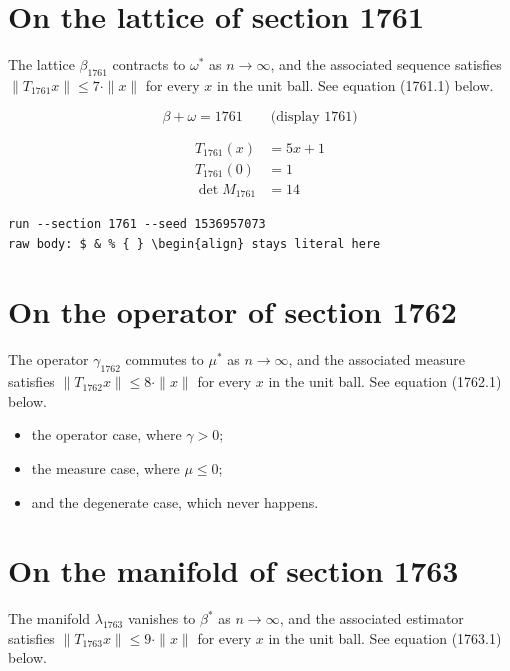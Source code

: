 \documentclass{article}
\begin{document}
\section{On the lattice of section 1761}
The lattice $\beta_{1761}$ contracts to $\omega^{*}$ as $n \to \infty$,
and the associated sequence satisfies $\|T_{1761} x\| \leq 7 \cdot \|x\|$
for every $x$ in the unit ball. See equation (1761.1) below.

$$
\beta + \omega = 1761 \qquad \text{(display 1761)}
$$

\begin{align}
T_{1761}(x) &= 5 x + 1 \\
T_{1761}(0) &= 1 \\
\det M_{1761} &= 14
\end{align}

\begin{verbatim}
run --section 1761 --seed 1536957073
raw body: $ & % { } \begin{align} stays literal here
\end{verbatim}

\section{On the operator of section 1762}
The operator $\gamma_{1762}$ commutes to $\mu^{*}$ as $n \to \infty$,
and the associated measure satisfies $\|T_{1762} x\| \leq 8 \cdot \|x\|$
for every $x$ in the unit ball. See equation (1762.1) below.

\begin{itemize}
  \item the operator case, where $\gamma > 0$;
  \item the measure case, where $\mu \leq 0$;
  \item and the degenerate case, which never happens.
\end{itemize}

\section{On the manifold of section 1763}
The manifold $\lambda_{1763}$ vanishes to $\beta^{*}$ as $n \to \infty$,
and the associated estimator satisfies $\|T_{1763} x\| \leq 9 \cdot \|x\|$
for every $x$ in the unit ball. See equation (1763.1) below.
\end{document}
